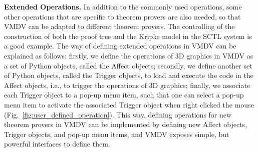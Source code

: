 \documentclass[runningheads]{llncs}
\newcommand\tool[1]{\textsf{#1}}
\newcommand\vmdv{\tool{VMDV}}
\begin{document}

\vspace{0.1cm}
\hspace{-0.5cm}
{\bf Extended Operations.}
In addition to the commonly used operations, some other operations that are specific to theorem provers are also needed, so that \vmdv{} can be adapted to different theorem provers. The controlling of the construction of both the proof tree and the Kripke model in the \textsf{SCTL} system is a good example. 
The way of defining extended operations in \vmdv{} can be explained as follows: firstly, we define the operations of 3D graphics in \tool{VMDV} as a set of \tool{Python} objects, called the \textsf{Affect} objects; secondly, we define another set of \tool{Python} objects, called the \textsf{Trigger} objects, to load and execute the code in the \textsf{Affect} objects, i.e., to trigger the operations of 3D graphics; finally, we associate each \textsf{Trigger} object to a pop-up menu item, such that one can select a pop-up menu item to activate the associated \textsf{Trigger} object when right clicked the mouse (Fig.~\ref{fig:user_defined_operation}).
This way, defining operations for new theorem provers in \vmdv{} can be implemented by defining new \textsf{Affect} objects, \textsf{Trigger} objects, and pop-up menu items, and \vmdv{} exposes simple, but powerful interfaces to define them.


 
\end{document}
